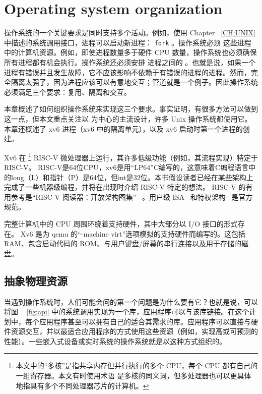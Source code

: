 \documentclass[UTF8]{article}
\begin{document}
  

   \chapter{Operating system organization}   
    \label{CH:FIRST}     

操作系统的一个关键要求是同时支持多个活动。例如，使用 Chapter~    \ref{CH:UNIX}    中描述的系统调用接口，进程可以启动新进程：
    \lstinline{fork}    。操作系统必须
        这些进程中的计算机资源。例如，即使进程数量多于硬件 CPU 数量，操作系统也必须确保所有进程都有机会执行。操作系统还必须安排
 进程之间的       。也就是说，如果一个进程有错误并且发生故障，它不应该影响不依赖于有错误的进程的进程。然而，完全隔离太强了，因为进程应该可以有意地交互；管道就是一个例子。因此操作系统必须满足三个要求：复用、隔离和交互。  

本章概述了如何组织操作系统来实现这三个要求。事实证明，有很多方法可以做到这一点，但本文重点关注以        为中心的主流设计，许多 Unix 操作系统都使用它。本章还概述了 xv6 进程（xv6 中的隔离单元），以及 xv6 启动时第一个进程的创建。  

Xv6 在           \footnote{本文中的“多核”是指共享内存但并行执行的多个 CPU，每个 CPU 都有自己的一组寄存器。本文有时使用术语
        是多核的同义词，但多处理器也可以更具体地指具有多个不同处理器芯片的计算机。  }    RISC-V 微处理器上运行，其许多低级功能（例如，其流程实现）特定于 RISC-V。 RISC-V是64位CPU，xv6是用“LP64”C编写的，这意味着C编程语言中的long（L）和指针（P）是64位，但int是32位。本书假设读者已经在某些架构上完成了一些机器级编程，并将在出现时介绍 RISC-V 特定的想法。 RISC-V 的有用参考是“RISC-V 阅读器：开放架构图集”~    \cite{riscv}   。用户级 ISA~    \cite{riscv:user}    和特权架构~    \cite{riscv:priv}    是官方规范。  

完整计算机中的 CPU 周围环绕着支持硬件，其中大部分以 I/O 接口的形式存在。 Xv6 是为 qemu 的“-machine virt”选项模拟的支持硬件而编写的。这包括 RAM、包含启动代码的 ROM、与用户键盘/屏幕的串行连接以及用于存储的磁盘。
    \section{抽象物理资源  }     

当遇到操作系统时，人们可能会问的第一个问题是为什么要有它？也就是说，可以将图 ~    \ref{fig:api}    中的系统调用实现为一个库，应用程序可以与该库链接。在这个计划中，每个应用程序甚至可以拥有自己的适合其需求的库。应用程序可以直接与硬件资源交互，并以最适合应用程序的方式使用这些资源（例如，实现高或可预测的性能）。一些嵌入式设备或实时系统的操作系统就是以这种方式组织的。  
\end{document}
